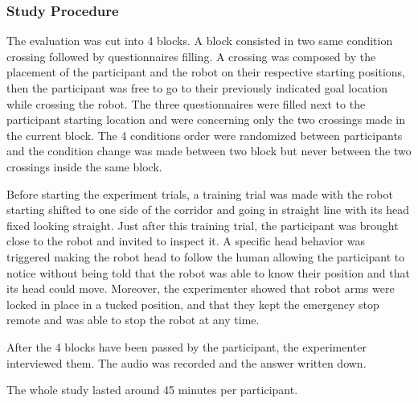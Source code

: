 \documentclass[a4paper,11pt,twoside]{StyleThese}
\begin{document}
\subsubsection{Study Procedure}
The evaluation was cut into 4 blocks. A block consisted in two same condition crossing followed by questionnaires filling. A crossing was composed by the placement of the participant and the robot on their respective starting positions, then the participant was free to go to their previously indicated goal location while crossing the robot. The three questionnaires were filled next to the participant starting location and were concerning only the two crossings made in the current block. The 4 conditions order were randomized between participants and the condition change was made between two block but never between the two crossings inside the same block.

Before starting the experiment trials, a training trial was made with the robot starting shifted to one side of the corridor and going in straight line with its head fixed looking straight. Just after this training trial, the participant was brought close to the robot and invited to inspect it. A specific head behavior was triggered making the robot head to follow the human allowing the participant to notice without being told that the robot was able to know their position and that its head could move. Moreover, the experimenter showed that robot arms were locked in place in a tucked position, and that they kept the emergency stop remote and was able to stop the robot at any time.

After the 4 blocks have been passed by the participant, the experimenter interviewed them. The audio was recorded and the answer written down.

The whole study lasted around 45 minutes per participant.
\end{document}
